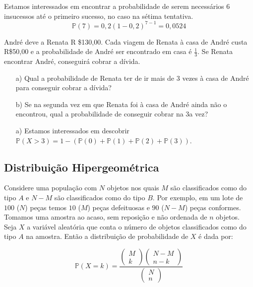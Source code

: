 \documentclass[10pt,a4paper]{article}
\begin{document}
\begin{sol}
	Estamos interessados em encontrar a probabilidade de serem necessários 6 insucessos até o primeiro sucesso, no caso na sétima tentativa.
	\[\mathbb{P}(7) = 0,2(1-0,2)^{7-1} = 0,0524\]
\end{sol}

\begin{ex}
	André deve a Renata R \$130,00. Cada viagem de Renata à casa de André custa R\$50,00 e a probabilidade de André ser encontrado em casa é $\frac{1}{3}$. Se Renata encontrar André, conseguirá cobrar a dívida.
	\begin{itemize}
		\item[a)] Qual a probabilidade de Renata ter de ir mais de 3 vezes à casa de André para conseguir cobrar a dívida? 
		\item[b)] Se na segunda vez em que Renata foi à casa de André ainda não o encontrou, qual a probabilidade de conseguir cobrar na 3a vez?
	\end{itemize}
\end{ex}

\begin{sol}
	\begin{itemize}
		\item[a)] Estamos interessados em descobrir $\mathbb{P}(X > 3) = 1 - (\mathbb{P}(0) + \mathbb{P}(1) + \mathbb{P}(2) + \mathbb{P}(3))$.
		
		
	\end{itemize}
\end{sol}

\subsection{ Distribuição Hipergeométrica}

Considere uma população com $ N $ objetos nos quais $ M $ são classificados como do tipo $ A $ e $ N-M $ são classificados como do tipo $ B $. Por exemplo, em um lote de $ 100 $ ($ N $) peças temos $ 10 $ ($ M $) peças defeituosas e $ 90 $ ($ N-M $) peças conformes. Tomamos uma amostra ao acaso, sem reposição e não ordenada de $ n $ objetos. Seja $ X $ a variável aleatória que conta o número de objetos classificados como do tipo $ A $ na amostra. Então a distribuição de probabilidade de $ X $ é dada por:

\[\mathbb{P}\left(X=k\right)=\frac{\left(\begin{array}{c}M\\k\end{array}\right)\left(\begin{array}{c}N-M\\n-k\end{array}\right)}{\left(\begin{array}{c}N\\n\end{array}\right)}\] 	
\end{document}
